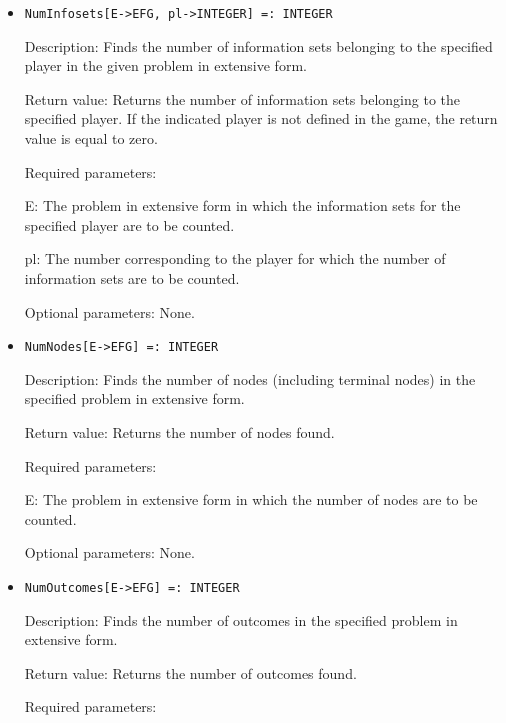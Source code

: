 \begin{itemize}
\item
\protect \large \begin{verbatim}
NumInfosets[E->EFG, pl->INTEGER] =: INTEGER
\end{verbatim}\normalsize

\bd
\item
[Description:] Finds the number of information sets belonging to the
specified player in the given problem in extensive form.
\item
[Return value:] Returns the number of information sets belonging to
the specified player.  If the indicated player is not defined in the 
game, the return value is equal to zero.
\item
[Required parameters:]\hfil\null

\bd
\item
[ E:] The problem in extensive form in which the information sets
for the specified player are to be counted.	  
\item
[ pl:] The number corresponding to the player for which the number 
of information sets are to be counted.
\ed
\item
 [Optional parameters:] None.
\ed

\item
\protect \large \begin{verbatim}
NumNodes[E->EFG] =: INTEGER
\end{verbatim}\normalsize

\bd
\item
[Description:] Finds the number of nodes (including terminal nodes) in 
the specified problem in extensive form.
\item
[Return value:] Returns the number of nodes found.
\item
[Required parameters:]\hfil\null

\bd
\item
[E:] The problem in extensive form in which the number of nodes are
to be counted.
\ed

\item
[Optional parameters:] None.
\ed

\item
\protect \large \begin{verbatim}
NumOutcomes[E->EFG] =: INTEGER
\end{verbatim}

\normalsize

\bd
\item
[Description:] Finds the number of outcomes in the specified problem in
extensive form.
\item
[Return value:] Returns the number of outcomes found.
\item
[Required parameters:] \hfil\null	  


\end{itemize}
